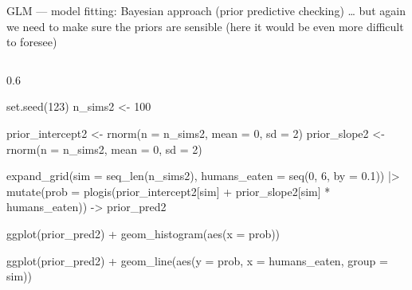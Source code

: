 \documentclass[
  10pt,
  ignorenonframetext,
  aspectratio=169,
  t]{beamer}
\newenvironment{Shaded}{\begin{snugshade}}{\end{snugshade}}
\newcommand{\AttributeTok}[1]{\textcolor[rgb]{0.40,0.45,0.13}{#1}}
\newcommand{\DecValTok}[1]{\textcolor[rgb]{0.68,0.00,0.00}{#1}}
\newcommand{\FloatTok}[1]{\textcolor[rgb]{0.68,0.00,0.00}{#1}}
\newcommand{\FunctionTok}[1]{\textcolor[rgb]{0.28,0.35,0.67}{#1}}
\newcommand{\NormalTok}[1]{\textcolor[rgb]{0.00,0.23,0.31}{#1}}
\newcommand{\OtherTok}[1]{\textcolor[rgb]{0.00,0.23,0.31}{#1}}
\newcommand{\SpecialCharTok}[1]{\textcolor[rgb]{0.37,0.37,0.37}{#1}}
\begin{document}
\begin{frame}[fragile]{GLM --- model fitting: Bayesian approach (prior
predictive checking)}
\protect{}\label{glm-model-fitting-bayesian-approach-prior-predictive-checking}
\ldots{} but again we need to make sure the priors are sensible (here it
would be even more difficult to foresee)

\begin{columns}[T]
\begin{column}{0.6\linewidth}
\footnotesize

\begin{Shaded}
\begin{Highlighting}[]
\FunctionTok{set.seed}\NormalTok{(}\DecValTok{123}\NormalTok{)}
\NormalTok{n\_sims2 }\OtherTok{\textless{}{-}} \DecValTok{100}

\NormalTok{prior\_intercept2 }\OtherTok{\textless{}{-}} \FunctionTok{rnorm}\NormalTok{(}\AttributeTok{n =}\NormalTok{ n\_sims2, }\AttributeTok{mean =} \DecValTok{0}\NormalTok{, }\AttributeTok{sd =} \DecValTok{2}\NormalTok{)}
\NormalTok{prior\_slope2 }\OtherTok{\textless{}{-}} \FunctionTok{rnorm}\NormalTok{(}\AttributeTok{n =}\NormalTok{ n\_sims2, }\AttributeTok{mean =} \DecValTok{0}\NormalTok{, }\AttributeTok{sd =} \DecValTok{2}\NormalTok{)}

\FunctionTok{expand\_grid}\NormalTok{(}\AttributeTok{sim =} \FunctionTok{seq\_len}\NormalTok{(n\_sims2),}
            \AttributeTok{humans\_eaten =} \FunctionTok{seq}\NormalTok{(}\DecValTok{0}\NormalTok{, }\DecValTok{6}\NormalTok{, }\AttributeTok{by =} \FloatTok{0.1}\NormalTok{)) }\SpecialCharTok{|\textgreater{}} 
  \FunctionTok{mutate}\NormalTok{(}\AttributeTok{prob =} \FunctionTok{plogis}\NormalTok{(prior\_intercept2[sim] }\SpecialCharTok{+} 
\NormalTok{      prior\_slope2[sim] }\SpecialCharTok{*}\NormalTok{ humans\_eaten)) }\OtherTok{{-}\textgreater{}}\NormalTok{ prior\_pred2}

\FunctionTok{ggplot}\NormalTok{(prior\_pred2) }\SpecialCharTok{+}
  \FunctionTok{geom\_histogram}\NormalTok{(}\FunctionTok{aes}\NormalTok{(}\AttributeTok{x =}\NormalTok{ prob))}
\end{Highlighting}
\end{Shaded}

\begin{Shaded}
\begin{Highlighting}[]
\FunctionTok{ggplot}\NormalTok{(prior\_pred2) }\SpecialCharTok{+}
  \FunctionTok{geom\_line}\NormalTok{(}\FunctionTok{aes}\NormalTok{(}\AttributeTok{y =}\NormalTok{ prob, }\AttributeTok{x =}\NormalTok{ humans\_eaten, }\AttributeTok{group =}\NormalTok{ sim))}
\end{Highlighting}
\end{Shaded}


\end{column}
\end{columns}
\end{frame}
\end{document}
